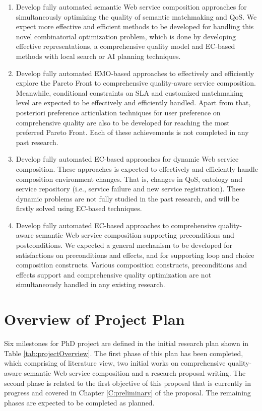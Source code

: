 \begin{enumerate}
 \item Develop fully automated semantic Web service composition approaches for simultaneously optimizing the quality of semantic matchmaking and QoS. We expect more effective and efficient methods to be developed for handling this novel combinatorial optimization problem, which is done by developing effective representations, a comprehensive quality model and EC-based methods with local search or AI planning techniques.

\item Develop fully automated EMO-based approaches to effectively and efficiently explore the Pareto Front to comprehensive quality-aware service composition. Meanwhile, conditional constraints on SLA and customized matchmaking level are expected to be effectively and efficiently handled. Apart from that, posteriori preference articulation techniques for user preference on comprehensive quality are also to be developed for reaching the most preferred Pareto Front. Each of these achievements is not completed in any past research.

\item Develop fully automated EC-based approaches for dynamic Web service composition. These approaches is expected to effectively and efficiently handle composition environment changes. That is, changes in QoS, ontology and service repository (i.e., service failure and new service registration). These dynamic problems are not fully studied in the past research, and will be firstly solved using EC-based techniques.

\item Develop fully automated EC-based approaches to comprehensive quality-aware semantic Web service composition supporting preconditions and postconditions. We expected a general mechanism to be developed for satisfactions on preconditions and effects, and for supporting loop and choice composition constructs. Various composition constructs, preconditions and effects support and comprehensive quality optimization are not simultaneously handled in any existing research.
\end{enumerate}

\section{Overview of Project Plan}

Six milestones for PhD project are defined in the initial research plan shown in Table \ref{tab:projectOverview}. The first phase of this plan has been completed, which comprising of literature view, two initial works on comprehensive quality-aware semantic Web service composition and a research proposal writing. The second phase is related to the first objective of this proposal that is currently in progress and covered in Chapter \ref{C:preliminary} of the proposal. The remaining phases are expected to be completed as planned.

